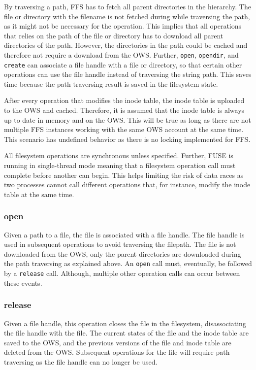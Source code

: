 By traversing a path, FFS has to fetch all parent directories in the hierarchy. The file or directory with the filename is not fetched during while traversing the path, as it might not be necessary for the operation. This implies that all operations that relies on the path of the file or directory has to download all parent directories of the path. However, the directories in the path could be cached and therefore not require a download from the OWS. Further, \texttt{open}, \texttt{opendir}, and \texttt{create} can associate a file handle with a file or directory, so that certain other operations can use the file handle instead of traversing the string path. This saves time because the path traversing result is saved in the filesystem state.

After every operation that modifies the inode table, the inode table is uploaded to the OWS and cached. Therefore, it is assumed that the inode table is always up to date in memory and on the OWS. This will be true as long as there are not multiple FFS instances working with the same OWS account at the same time. This scenario has undefined behavior as there is no locking implemented for FFS.

All filesystem operations are synchronous unless specified. Further, FUSE is running in single-thread mode meaning that a filesystem operation call must complete before another can begin. This helps limiting the risk of data races as two processes cannot call different operations that, for instance, modify the inode table at the same time.

\subsubsection{open}
Given a path to a file, the file is associated with a file handle. The file handle is used in subsequent operations to avoid traversing the filepath. The file is not downloaded from the OWS, only the parent directories are downloaded during the path traversing as explained above. An \texttt{open} call must, eventually, be followed by a \texttt{release} call. Although, multiple other operation calls can occur between these events.

\subsubsection{release}
Given a file handle, this operation closes the file in the filesystem, disassociating the file handle with the file. The current states of the file and the inode table are saved to the OWS, and the previous versions of the file and inode table are deleted from the OWS. Subsequent operations for the file will require path traversing as the file handle can no longer be used.

